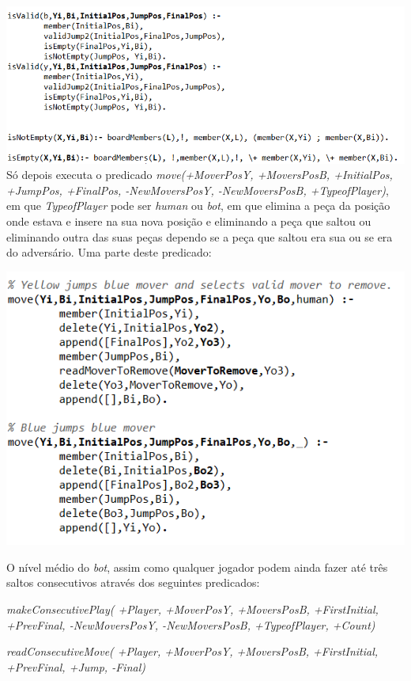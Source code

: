 \documentclass[a4paper]{article}
\begin{document}
\includegraphics[scale=0.8]{isvalid.png}\linebreak\linebreak 
Só depois executa o predicado \textit{move(+MoverPosY, +MoversPosB, +InitialPos, +JumpPos, +FinalPos, -NewMoversPosY, -NewMoversPosB, +TypeofPlayer)}, em que  \textit{TypeofPlayer} pode ser \textit{human} ou \textit{bot}, em que elimina a peça da posição onde estava e insere na sua nova posição e eliminando a peça que saltou ou eliminando outra das suas peças dependo se a peça que saltou era sua ou se era do adversário. Uma parte deste predicado:

\includegraphics[scale=0.8]{move.png}\linebreak\linebreak 

O nível médio do \textit{bot}, assim como qualquer jogador podem ainda fazer até três saltos consecutivos através dos seguintes predicados: 

\textit{makeConsecutivePlay( +Player, +MoverPosY, +MoversPosB, +FirstInitial, +PrevFinal, -NewMoversPosY, -NewMoversPosB, +TypeofPlayer, +Count)} 

\textit{readConsecutiveMove( +Player, +MoverPosY, +MoversPosB, +FirstInitial, +PrevFinal, +Jump, -Final)} 
\end{document}
